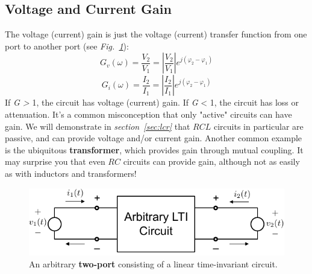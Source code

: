 \subsection{Voltage and Current Gain}
The voltage (current) gain is just the voltage (current) transfer function from one port to another port (see \emph{Fig.~\ref{fig:twoportivgain}}):
    \begin{equation}
        {G_v}(\omega ) = \frac{{{V_2}}}{{{V_1}}} = \left| {\frac{{{V_2}}}{{{V_1}}}} \right|{e^{j({\varphi _2} - {\varphi _1})}}
    \end{equation}
    \begin{equation}
        {G_i}(\omega ) = \frac{{{I_2}}}{{{I_1}}} = \left| {\frac{{{I_2}}}{{{I_1}}}} \right|{e^{j({\varphi _2} - {\varphi _1})}}
    \end{equation}
If \textit{G > }1, the circuit has voltage (current) gain.   If \textit{G} < 1, the circuit has loss or attenuation.   It's a common misconception that only "active" circuits can have gain.  We will demonstrate in \emph{section~\ref{sec:lcr}} that $RCL$ circuits in particular are passive, and can provide voltage and/or current gain.  Another common example is the ubiquitous \textbf{transformer}, which provides gain through mutual coupling.  It may surprise you that even $RC$ circuits can provide gain, although not as easily as with inductors and transformers!
\begin{figure}[H]
\centering
\includegraphics[width=.8\columnwidth]{mod1_3_1_twoport}
\caption{An arbitrary \textbf{two-port} consisting of a linear time-invariant circuit.}
\label{fig:twoportivgain}
\end{figure}
\newpage
